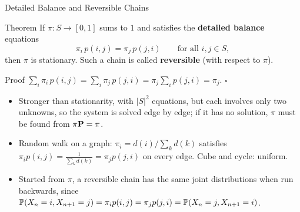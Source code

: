 \begin{frame}{Detailed Balance and Reversible Chains}
  \label{fr:db}
  \small
  \begin{block}{Theorem}
    If $\pi\colon S\to[0,1]$ sums to $1$ and satisfies the \textbf{detailed balance} equations
    \[
      \pi_i\,p(i,j)=\pi_j\,p(j,i)\qquad\text{for all } i,j\in S,
    \]
    then $\pi$ is stationary. Such a chain is called \textbf{reversible} (with respect to $\pi$).
  \end{block}
  \begin{block}{Proof}
    $\sum_i\pi_i\,p(i,j)=\sum_i\pi_j\,p(j,i)=\pi_j\sum_ip(j,i)=\pi_j$. \hfill$\square$
  \end{block}
  \begin{itemize}
    \item Stronger than stationarity, with $|S|^2$ equations, but each involves only two unknowns, so the system is solved edge by edge; if it has no solution, $\pi$ must be found from $\pi\mathbf{P}=\pi$.
    \item Random walk on a graph: $\pi_i=d(i)/\sum_kd(k)$ satisfies $\pi_ip(i,j)=\frac{1}{\sum_kd(k)}=\pi_jp(j,i)$ on every edge. Cube and cycle: uniform.
    \item Started from $\pi$, a reversible chain has the same joint distributions when run backwards, since $\mathbb{P}(X_n=i,X_{n+1}=j)=\pi_ip(i,j)=\pi_jp(j,i)=\mathbb{P}(X_n=j,X_{n+1}=i)$.
  \end{itemize}
\end{frame}

